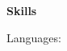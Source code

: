 \noindent\textbf{Skills}
\noindent\hrulefill
\vspace{0.25em}
\begin{adjustwidth}{1.5em}{0em}
Languages:
\end{adjustwidth}
\vspace{0.25em}